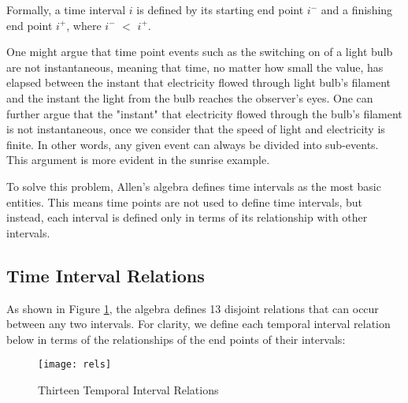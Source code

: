 \documentclass[11pt]{report}
\begin{document}
        Formally, a time interval $i$ is defined by its starting end point ${i^-}$ and
        a finishing end point ${i^+}$, where ${i^-}$ $<$ ${i^+}$. 

        One might argue that time point events such as the switching on of a light bulb
        are not instantaneous, meaning that time, no matter how small the value, has
        elapsed between the instant that electricity flowed through light bulb's
        filament and the instant the light from the bulb reaches the observer's eyes.
        One can further argue that the "instant" that electricity flowed through the
        bulb's filament is not instantaneous, once we consider that the speed of light
        and electricity is finite. In other words, any given event can always be
        divided into sub-events. This argument is more evident in the sunrise example.

        To solve this problem, Allen's algebra defines time intervals as the most basic
        entities. This means time points are not used to define time intervals, but
        instead, each interval is defined only in terms of its relationship with other
        intervals.

      \subsection{Time Interval Relations}

        As shown in Figure \ref{fig-rels}, the algebra defines 13 disjoint relations
        that can occur between any two intervals. For clarity, we define each temporal
        interval relation below in terms of the relationships of the end points of
        their intervals:

        \begin{figure}[[tbhp]
          \begin{center}
            \texttt{[image: rels]}
            \caption{Thirteen Temporal Interval Relations}
            \label{fig-rels}
          \end{center}
        \end{figure}
\end{document}
